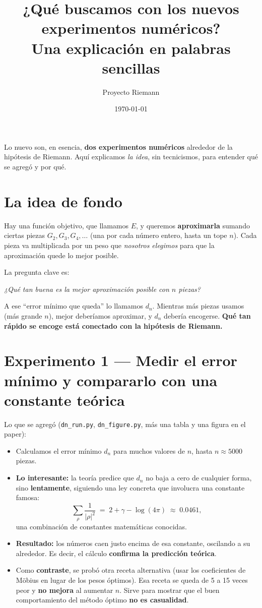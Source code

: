 \documentclass[11pt]{article}
\title{\textbf{¿Qué buscamos con los nuevos experimentos numéricos?}\\[2pt]
\large Una explicación en palabras sencillas}
\author{Proyecto Riemann}
\date{\today}
\begin{document}
\maketitle

\noindent
Lo nuevo son, en esencia, \textbf{dos experimentos numéricos} alrededor de la
hipótesis de Riemann. Aquí explicamos \emph{la idea}, sin tecnicismos, para
entender qué se agregó y por qué.

\section*{La idea de fondo}

Hay una función objetivo, que llamamos $E$, y queremos \textbf{aproximarla}
sumando ciertas piezas $G_2, G_3, G_4, \dots$ (una por cada número entero, hasta
un tope $n$). Cada pieza va multiplicada por un peso que \emph{nosotros elegimos}
para que la aproximación quede lo mejor posible.

La pregunta clave es:
\begin{center}
\emph{¿Qué tan buena es la mejor aproximación posible con $n$ piezas?}
\end{center}
A ese ``error mínimo que queda'' lo llamamos $d_n$. Mientras más piezas usamos
(más grande $n$), mejor deberíamos aproximar, y $d_n$ debería encogerse.
\textbf{Qué tan rápido se encoge está conectado con la hipótesis de Riemann.}

\section*{Experimento 1 — Medir el error mínimo y compararlo con una constante teórica}

Lo que se agregó (\texttt{dn\_run.py}, \texttt{dn\_figure.py}, más una tabla y una
figura en el paper):

\begin{itemize}[leftmargin=*]
  \item Calculamos el error mínimo $d_n$ para muchos valores de $n$, hasta
        $n \approx 5000$ piezas.
  \item \textbf{Lo interesante:} la teoría predice que $d_n$ no baja a cero de
        cualquier forma, sino \textbf{lentamente}, siguiendo una ley concreta que
        involucra una constante famosa:
        \[
          \sum_{\rho}\frac{1}{|\rho|^2} \;=\; 2 + \gamma - \log(4\pi)\;\approx\;0.0461,
        \]
        una combinación de constantes matemáticas conocidas.
  \item \textbf{Resultado:} los números caen justo encima de esa constante,
        oscilando a su alrededor. Es decir, el cálculo \textbf{confirma la
        predicción teórica}.
  \item Como \textbf{contraste}, se probó otra receta alternativa (usar los
        coeficientes de Möbius en lugar de los pesos óptimos). Esa receta se queda
        de 5 a 15 veces peor y \textbf{no mejora} al aumentar $n$. Sirve para
        mostrar que el buen comportamiento del método óptimo \textbf{no es
        casualidad}.
\end{itemize}
\end{document}
